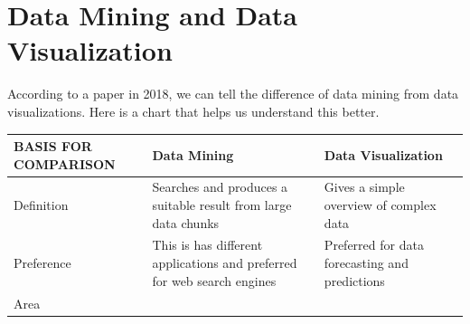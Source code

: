 \documentclass[]{book}
\theoremstyle{definition}
\theoremstyle{definition}
\theoremstyle{definition}
\theoremstyle{remark}
\begin{document}
\section{Data Mining and Data
Visualization}\label{data-mining-and-data-visualization}

According to a paper in 2018, we can tell the difference of data mining
from data visualizations. Here is a chart that helps us understand this
better.

\begin{longtable}[]{@{}lll@{}}
\toprule
\begin{minipage}[b]{0.08\columnwidth}\raggedright\strut
\textbf{BASIS FOR COMPARISON}\strut
\end{minipage} & \begin{minipage}[b]{0.41\columnwidth}\raggedright\strut
\textbf{Data Mining}\strut
\end{minipage} & \begin{minipage}[b]{0.41\columnwidth}\raggedright\strut
\textbf{Data Visualization}\strut
\end{minipage}\tabularnewline
\midrule
\endhead
\begin{minipage}[t]{0.08\columnwidth}\raggedright\strut
Definition\strut
\end{minipage} & \begin{minipage}[t]{0.41\columnwidth}\raggedright\strut
Searches and produces a suitable result from large data chunks\strut
\end{minipage} & \begin{minipage}[t]{0.41\columnwidth}\raggedright\strut
Gives a simple overview of complex data\strut
\end{minipage}\tabularnewline
\begin{minipage}[t]{0.08\columnwidth}\raggedright\strut
Preference\strut
\end{minipage} & \begin{minipage}[t]{0.41\columnwidth}\raggedright\strut
This is has different applications and preferred for web search
engines\strut
\end{minipage} & \begin{minipage}[t]{0.41\columnwidth}\raggedright\strut
Preferred for data forecasting and predictions\strut
\end{minipage}\tabularnewline
\begin{minipage}[t]{0.08\columnwidth}\raggedright\strut
Area\strut
\end{minipage} & \begin{minipage}[t]{0.41\columnwidth}\raggedright\strut

\end{minipage}
\end{longtable}
\end{document}
